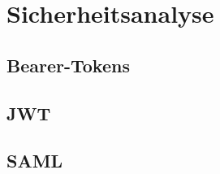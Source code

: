 \section{Sicherheitsanalyse}
\subsection{Bearer-Tokens}
\subsection{JWT}
\subsection{SAML}


\blindtext{}
